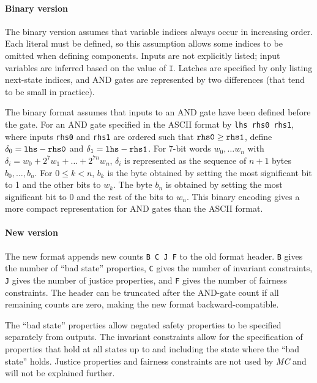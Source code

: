 \documentclass[12pt,a4paper,twoside,openright]{report}
\begin{document}
{{\paragraph{Binary version}{
The binary version assumes that variable indices always
occur in increasing order. Each literal must be defined, so this assumption
allows some indices to be omitted when defining components.
Inputs are not explicitly listed; input variables are inferred based on
the value of \verb,I,.
Latches are specified by only listing next-state
indices, and AND gates are represented by two differences (that tend to be
small in practice).

The binary format assumes that inputs to an AND gate
have been defined before the gate.
For an AND gate specified in the ASCII format by \verb,lhs rhs0 rhs1,,
where inputs \verb,rhs0, and \verb,rhs1, are ordered such that
$\verb,rhs0, \geq \verb,rhs1,$, define
$\delta_0 = \verb,lhs, - \verb,rhs0,$
and
$\delta_1 = \verb,lhs, - \verb,rhs1,$.
For 7-bit words $w_0, \ldots w_n$ with
$\delta_i = w_0 + 2^7w_1 + \ldots + 2^{7n}w_n$,
$\delta_i$ is represented as the sequence of $n + 1$ bytes
$b_0, \ldots, b_n$.
For $0 \leq k < n$, $b_k$ is the byte obtained by setting the most
significant bit to 1 and the other bits to $w_k$. The byte
$b_n$ is obtained by setting the most
significant bit to 0 and the rest of the bits to $w_n$.
This binary encoding gives a more compact representation for AND
gates than the ASCII format.
}

\paragraph{New version} {
The new format appends new counts \verb,B C J F, to the old
format header.
\verb,B, gives the number of ``bad state'' properties,
\verb,C, gives the number of invariant constraints,
\verb,J, gives the number of justice properties, and
\verb,F, gives the number of fairness constraints.
The header can be truncated
after the AND-gate count if all remaining counts are
zero, making the new format
backward-compatible.

The ``bad state'' properties allow negated safety properties to be specified
separately from outputs.
The invariant constraints allow for the specification of properties that
hold at all states up to and including the state where the ``bad state''
holds.
Justice properties and fairness constraints are not used by
\emph{MC} and will not be explained further.

}}}
\end{document}
